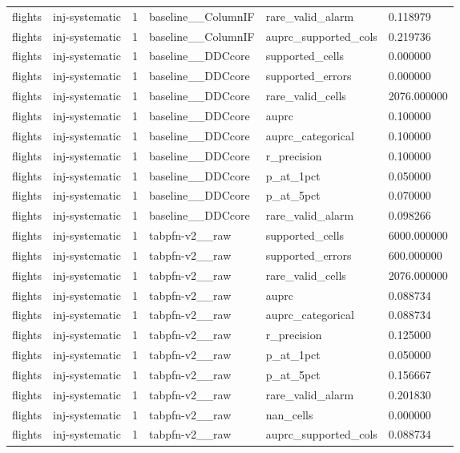\begin{tabular}{llllll}
flights & inj-systematic & 1 & baseline\_\_ColumnIF & rare\_valid\_alarm & 0.118979 \\
flights & inj-systematic & 1 & baseline\_\_ColumnIF & auprc\_supported\_cols & 0.219736 \\
flights & inj-systematic & 1 & baseline\_\_DDCcore & supported\_cells & 0.000000 \\
flights & inj-systematic & 1 & baseline\_\_DDCcore & supported\_errors & 0.000000 \\
flights & inj-systematic & 1 & baseline\_\_DDCcore & rare\_valid\_cells & 2076.000000 \\
flights & inj-systematic & 1 & baseline\_\_DDCcore & auprc & 0.100000 \\
flights & inj-systematic & 1 & baseline\_\_DDCcore & auprc\_categorical & 0.100000 \\
flights & inj-systematic & 1 & baseline\_\_DDCcore & r\_precision & 0.100000 \\
flights & inj-systematic & 1 & baseline\_\_DDCcore & p\_at\_1pct & 0.050000 \\
flights & inj-systematic & 1 & baseline\_\_DDCcore & p\_at\_5pct & 0.070000 \\
flights & inj-systematic & 1 & baseline\_\_DDCcore & rare\_valid\_alarm & 0.098266 \\
flights & inj-systematic & 1 & tabpfn-v2\_\_raw & supported\_cells & 6000.000000 \\
flights & inj-systematic & 1 & tabpfn-v2\_\_raw & supported\_errors & 600.000000 \\
flights & inj-systematic & 1 & tabpfn-v2\_\_raw & rare\_valid\_cells & 2076.000000 \\
flights & inj-systematic & 1 & tabpfn-v2\_\_raw & auprc & 0.088734 \\
flights & inj-systematic & 1 & tabpfn-v2\_\_raw & auprc\_categorical & 0.088734 \\
flights & inj-systematic & 1 & tabpfn-v2\_\_raw & r\_precision & 0.125000 \\
flights & inj-systematic & 1 & tabpfn-v2\_\_raw & p\_at\_1pct & 0.050000 \\
flights & inj-systematic & 1 & tabpfn-v2\_\_raw & p\_at\_5pct & 0.156667 \\
flights & inj-systematic & 1 & tabpfn-v2\_\_raw & rare\_valid\_alarm & 0.201830 \\
flights & inj-systematic & 1 & tabpfn-v2\_\_raw & nan\_cells & 0.000000 \\
flights & inj-systematic & 1 & tabpfn-v2\_\_raw & auprc\_supported\_cols & 0.088734 \\

\end{tabular}

